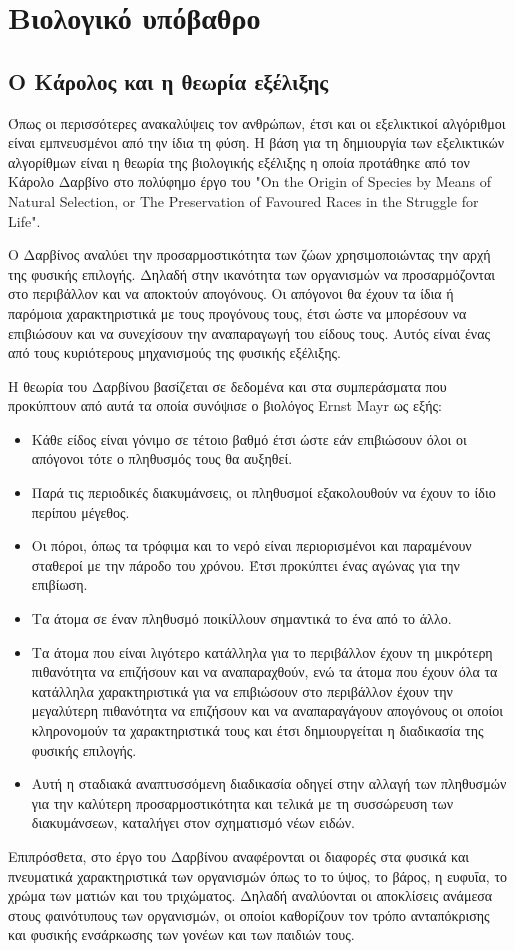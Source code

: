 \section{Βιολογικό υπόβαθρο}

\subsection{Ο Κάρολος και η θεωρία εξέλιξης}
Όπως οι περισσότερες ανακαλύψεις τον ανθρώπων, έτσι και οι εξελικτικοί αλγόριθμοι είναι εμπνευσμένοι από την ίδια τη φύση. Η βάση για τη δημιουργία των εξελικτικών αλγορίθμων είναι η θεωρία της βιολογικής εξέλιξης η οποία προτάθηκε από τον Κάρολο Δαρβίνο στο πολύφημο έργο του "On the Origin of Species by Means of Natural Selection, or The Preservation of Favoured Races in the Struggle for Life".

Ο Δαρβίνος αναλύει την προσαρμοστικότητα των ζώων χρησιμοποιώντας την αρχή της φυσικής επιλογής. Δηλαδή στην ικανότητα των οργανισμών να προσαρμόζονται στο περιβάλλον και να αποκτούν απογόνους. Οι απόγονοι θα έχουν τα ίδια ή παρόμοια χαρακτηριστικά με τους προγόνους τους, έτσι ώστε να μπορέσουν να επιβιώσουν και να συνεχίσουν την αναπαραγωγή του είδους τους. Αυτός είναι ένας από τους κυριότερους μηχανισμούς της φυσικής εξέλιξης.

Η θεωρία του Δαρβίνου βασίζεται σε δεδομένα και στα συμπεράσματα που προκύπτουν από αυτά τα οποία συνόψισε ο βιολόγος Ernst Mayr ως εξής:
\begin{itemize}
    \item Κάθε είδος είναι γόνιμο σε τέτοιο βαθμό έτσι ώστε εάν επιβιώσουν όλοι οι απόγονοι τότε ο πληθυσμός τους θα αυξηθεί.
    \item Παρά τις περιοδικές διακυμάνσεις, οι πληθυσμοί εξακολουθούν να έχουν το ίδιο περίπου μέγεθος.
    \item Οι πόροι, όπως τα τρόφιμα και το νερό είναι περιορισμένοι και παραμένουν σταθεροί με την πάροδο του χρόνου. Έτσι προκύπτει ένας αγώνας για την επιβίωση.
    \item Τα άτομα σε έναν πληθυσμό ποικίλλουν σημαντικά το ένα από το άλλο.
    \item Τα άτομα που είναι λιγότερο κατάλληλα για το περιβάλλον έχουν τη μικρότερη πιθανότητα να επιζήσουν και να αναπαραχθούν, ενώ τα άτομα που έχουν όλα τα κατάλληλα χαρακτηριστικά για να επιβιώσουν στο περιβάλλον έχουν την μεγαλύτερη πιθανότητα να επιζήσουν και να αναπαραγάγουν απογόνους οι οποίοι κληρονομούν τα χαρακτηριστικά τους και έτσι δημιουργείται η διαδικασία της φυσικής επιλογής.
    \item Αυτή η σταδιακά αναπτυσσόμενη διαδικασία οδηγεί στην αλλαγή των πληθυσμών για την καλύτερη προσαρμοστικότητα και τελικά με τη συσσώρευση των διακυμάνσεων, καταλήγει στον σχηματισμό νέων ειδών.
\end{itemize}
Επιπρόσθετα, στο έργο του Δαρβίνου αναφέρονται οι διαφορές στα φυσικά και πνευματικά χαρακτηριστικά των οργανισμών \cite{Adamidis} όπως το το ύψος, το βάρος, η ευφυΐα, το χρώμα των ματιών και του τριχώματος. Δηλαδή αναλύονται οι αποκλίσεις ανάμεσα στους φαινότυπους των οργανισμών, οι οποίοι καθορίζουν τον τρόπο ανταπόκρισης και φυσικής ενσάρκωσης των γονέων και των παιδιών τους.

